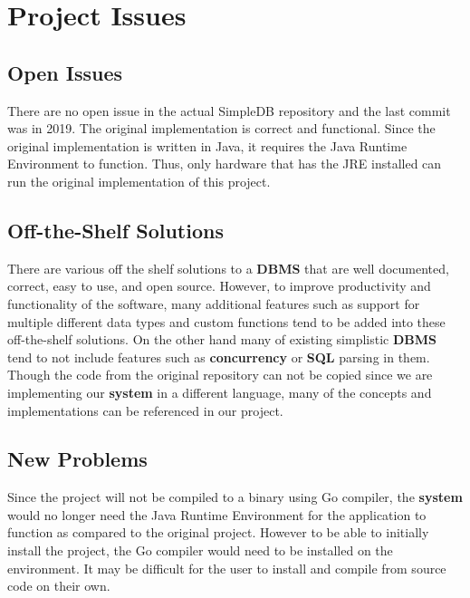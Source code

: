 \documentclass[12pt, titlepage]{article}
\begin{document}
\section{Project Issues}

\subsection{Open Issues}

There are no open issue in the actual SimpleDB repository and the last commit was in 2019. The original implementation is correct and functional. Since the original implementation is written in Java, it requires the Java Runtime Environment to function. Thus, only hardware that has the JRE installed can run the original implementation of this project.

\subsection{Off-the-Shelf Solutions}

There are various off the shelf solutions to a \textbf{DBMS} that are well documented, correct, easy to use, and open source. However, to improve productivity and functionality of the software, many additional features such as support for multiple different data types and custom functions tend to be added into these off-the-shelf solutions. On the other hand many of existing simplistic \textbf{DBMS} tend to not include features such as \textbf{concurrency} or \textbf{SQL} parsing in them.\\

\noindent Though the code from the original repository can not be copied since we are implementing our \textbf{system} in a different language, many of the concepts and implementations can be referenced in our project.

\subsection{New Problems}

Since the project will not be compiled to a binary using Go compiler, the \textbf{system} would no longer need the Java Runtime Environment for the application to function as compared to the original project. However to be able to initially install the project, the Go compiler would need to be installed on the environment. It may be difficult for the user to install and compile from source code on their own.
\end{document}
